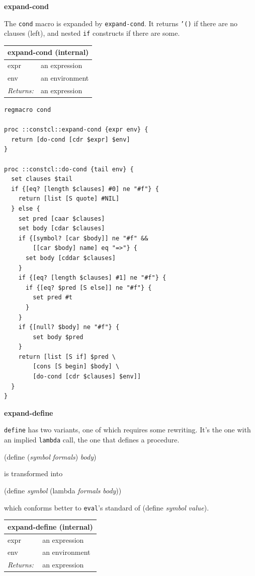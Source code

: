 \documentclass[twoside,9pt]{report}
\begin{document}
\textbf{expand-cond}


The \texttt{cond} macro is expanded by \texttt{expand-cond}. It returns \texttt{'()} if there are no clauses (left), and nested \texttt{if} constructs if there are some.

\begin{tabular}{ |l l| }
\hline
\multicolumn{2}{|l|}{expand-cond (internal)} \\
\hline
expr & an expression \\
env & an environment \\
\textit{Returns:} & an expression \\
\hline
\end{tabular}

\noindent\makebox[\linewidth]{\rule{\linewidth}{0.4pt}}
\begin{lstlisting}
regmacro cond
 
proc ::constcl::expand-cond {expr env} {
  return [do-cond [cdr $expr] $env]
}
 
proc ::constcl::do-cond {tail env} {
  set clauses $tail
  if {[eq? [length $clauses] #0] ne "#f"} {
    return [list [S quote] #NIL]
  } else {
    set pred [caar $clauses]
    set body [cdar $clauses]
    if {[symbol? [car $body]] ne "#f" &&
        [[car $body] name] eq "=>"} {
      set body [cddar $clauses]
    }
    if {[eq? [length $clauses] #1] ne "#f"} {
      if {[eq? $pred [S else]] ne "#f"} {
        set pred #t
      }
    }
    if {[null? $body] ne "#f"} {
        set body $pred
    }
    return [list [S if] $pred \
        [cons [S begin] $body] \
        [do-cond [cdr $clauses] $env]]
  }
}
\end{lstlisting}
\noindent\makebox[\linewidth]{\rule{\linewidth}{0.4pt}}

\textbf{expand-define}


\texttt{define} has two variants, one of which requires some rewriting. It's the one with an implied \texttt{lambda} call, the one that defines a procedure.


(define (\emph{symbol} \emph{formals}) \emph{body})


is transformed into


(define \emph{symbol} (lambda \emph{formals} \emph{body}))


which conforms better to \texttt{eval}'s standard of (define \emph{symbol} \emph{value}).

\begin{tabular}{ |l l| }
\hline
\multicolumn{2}{|l|}{expand-define (internal)} \\
\hline
expr & an expression \\
env & an environment \\
\textit{Returns:} & an expression \\
\hline
\end{tabular}
\end{document}
